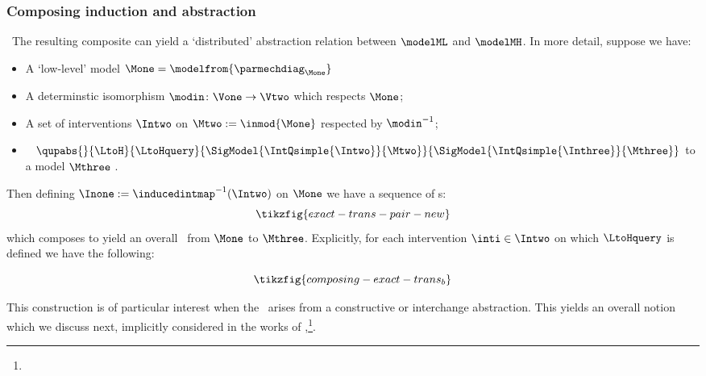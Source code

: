 \documentclass{article}
\begin{document}
\subsubsection{Composing induction and abstraction} \label{subsubsec:isoCCA} 
\ 
The resulting composite can yield a `distributed' abstraction relation between $\modelML$ and $\modelMH$. 
In more detail, suppose we have:
\begin{itemize}
\item A `low-level' model $\Mone=\modelfrom{\parmechdiag_{\Mone}}$  
\item A determinstic isomorphism $\modin \colon \Vone \to \Vtwo$ which respects $\Mone$;
\item A set of interventions $\Intwo$ on $\Mtwo := \inmod{\Mone}$ respected by $\modin^{-1}$;
\item \rlc{An}\ \qup{} $\qupabs{}{\LtoH}{\LtoHquery}{\SigModel{\IntQsimple{\Intwo}}{\Mtwo}}{\SigModel{\IntQsimple{\Inthree}}{\Mthree}}$ to a model $\Mthree$ .
\end{itemize}
Then defining $\Inone := \inducedintmap^{-1}(\Intwo)$ on $\Mone$ we have a sequence of \qup s:\ 
\begin{equation} \label{eq:induction-circ-u-abs}
	\tikzfig{exact-trans-pair-new}
\end{equation}
which composes to yield an overall  \qup{} \rlb{$(\LtoH \circ \modin, \LtoHquery \circ \inducedintmap)$}\ from $\Mone$ to $\Mthree$. Explicitly, for each intervention $\inti\in \Intwo$ on which $\LtoHquery$ is defined we have the following:

\begin{equation} \label{eq:compose-exact-trans-explicit}
\tikzfig{composing-exact-trans_b}
\end{equation}

This construction is of particular interest when the \qup{} \rlb{$(\LtoH, \LtoHquery)$}\ arises from a constructive or interchange abstraction. 
This yields an overall notion which we discuss next, implicitly considered in the works of \cite{geiger2024finding, geiger2023causal},\footnote{}. 
\end{document}
